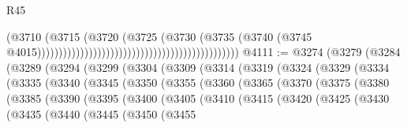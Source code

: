 \begin{lexlean}{R45}
\begin{coremodule}
{                                                                                  (@3710
                                                                                    (@3715
                                                                                      (@3720
                                                                                        (@3725
                                                                                          (@3730
                                                                                            (@3735
                                                                                              (@3740
                                                                                                (@3745
                                                                                                  @4015)))))))))))))))))))))))))))))))))))))))))))))))
@4111 := @3274
    (@3279
      (@3284
        (@3289
          (@3294
            (@3299
              (@3304
                (@3309
                  (@3314
                    (@3319
                      (@3324
                        (@3329
                          (@3334
                            (@3335
                              (@3340
                                (@3345
                                  (@3350
                                    (@3355
                                      (@3360
                                        (@3365
                                          (@3370
                                            (@3375
                                              (@3380
                                                (@3385
                                                  (@3390
                                                    (@3395
                                                      (@3400
                                                        (@3405
                                                          (@3410
                                                            (@3415
                                                              (@3420
                                                                (@3425
                                                                  (@3430
                                                                    (@3435
                                                                      (@3440
                                                                        (@3445
                                                                          (@3450
                                                                            (@3455
}
\end{coremodule}
\end{lexlean}
